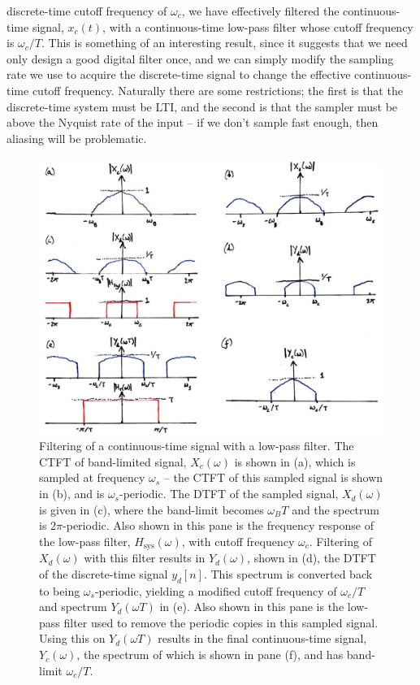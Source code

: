 discrete-time cutoff frequency of $\omega_c$, we have
effectively filtered the continuous-time signal, $x_c(t)$, with a
continuous-time low-pass filter whose cutoff frequency is $\omega_c / T$.
This is something of an interesting result, since it suggests that we need
only design a good digital filter once, and we can simply modify the sampling
rate we use to acquire the discrete-time signal to change the effective
continuous-time cutoff frequency. Naturally there are some restrictions;
the first is that the discrete-time system must be LTI, and the second is
that the sampler must be above the Nyquist rate of the input -- if we don't
sample fast enough, then aliasing will be problematic.
%
\begin{figure}[!htb]
  \includegraphics[width=\textwidth]{images/lecture_14_filtering_continuous.JPG}
  \caption{Filtering of a continuous-time signal with a low-pass filter.
    The CTFT of band-limited signal, $X_c(\omega)$ is shown in (a), which
    is sampled at frequency $\omega_s$ -- the CTFT of this sampled signal is
    shown in (b), and is $\omega_s$-periodic. The DTFT of the sampled signal,
    $X_d(\omega)$ is given in (c), where the band-limit becomes $\omega_B T$ and
    the spectrum is $2\pi$-periodic. Also shown in this pane is the frequency
    response of the low-pass filter, $H_\mathrm{sys}(\omega)$, with cutoff frequency
    $\omega_c$. Filtering of $X_d(\omega)$ with this filter results in $Y_d(\omega)$,
    shown in (d), the DTFT of the discrete-time signal $y_d[n]$. This spectrum is
    converted back to being $\omega_s$-periodic, yielding a modified cutoff frequency
    of $\omega_c/T$ and spectrum $Y_d(\omega T)$ in (e). Also shown in this pane is
    the low-pass filter used to remove the periodic copies in this sampled signal.
    Using this on $Y_d(\omega T)$ results in the final continuous-time signal,
    $Y_c(\omega)$, the spectrum of which is shown in pane (f), and has band-limit
    $\omega_c / T$.
  }
  \label{fig::lecture_14_filtering_continuous}
\end{figure}
